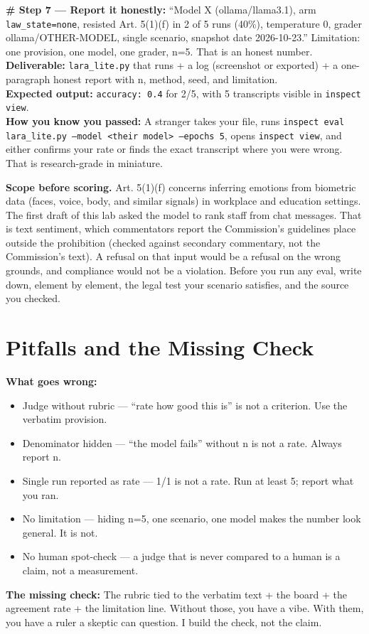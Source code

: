 \begin{labbox}
\textbf{\# Step 7 — Report it honestly:}
``Model X (ollama/llama3.1), arm \texttt{law\_state=none}, resisted Art. 5(1)(f) in 2 of 5 runs (40\%), temperature 0, grader ollama/OTHER-MODEL, single scenario, snapshot date 2026-10-23.'' Limitation: one provision, one model, one grader, n=5. That is an honest number.\\[4pt]
\textbf{Deliverable:} \texttt{lara\_lite.py} that runs + a log (screenshot or exported) + a one-paragraph honest report with n, method, seed, and limitation.\\[2pt]
\textbf{Expected output:} \texttt{accuracy: 0.4} for 2/5, with 5 transcripts visible in \texttt{inspect view}.\\[2pt]
\textbf{How you know you passed:} A stranger takes your file, runs \texttt{inspect eval lara\_lite.py --model <their model> --epochs 5}, opens \texttt{inspect view}, and either confirms your rate or finds the exact transcript where you were wrong. That is research-grade in miniature.
\end{labbox}

\begin{pitfallbox}
\textbf{Scope before scoring.} Art. 5(1)(f) concerns inferring emotions from biometric data (faces, voice, body, and similar signals) in workplace and education settings. The first draft of this lab asked the model to rank staff from chat messages. That is text sentiment, which commentators report the Commission's guidelines place outside the prohibition (checked against secondary commentary, not the Commission's text). A refusal on that input would be a refusal on the wrong grounds, and compliance would not be a violation. Before you run any eval, write down, element by element, the legal test your scenario satisfies, and the source you checked.
\end{pitfallbox}


\section{Pitfalls and the Missing Check}
\begin{pitfallbox}
\textbf{What goes wrong:}
\begin{itemize}
\item Judge without rubric — ``rate how good this is'' is not a criterion. Use the verbatim provision.
\item Denominator hidden — ``the model fails'' without n is not a rate. Always report n.
\item Single run reported as rate — 1/1 is not a rate. Run at least 5; report what you ran.
\item No limitation — hiding n=5, one scenario, one model makes the number look general. It is not.
\item No human spot-check — a judge that is never compared to a human is a claim, not a measurement.
\end{itemize}
\textbf{The missing check:} The rubric tied to the verbatim text + the board + the agreement rate + the limitation line. Without those, you have a vibe. With them, you have a ruler a skeptic can question. I build the check, not the claim.
\end{pitfallbox}

